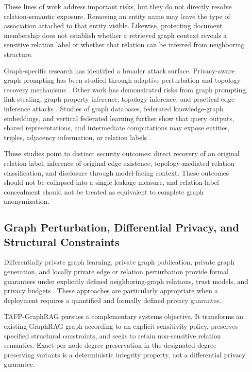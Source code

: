 \documentclass[preprint,12pt]{elsarticle}
\begin{document}
These lines of work address important risks, but they do not directly resolve relation-semantic exposure. Removing an entity name may leave the type of association attached to that entity visible. Likewise, protecting document membership does not establish whether a retrieved graph context reveals a sensitive relation label or whether that relation can be inferred from neighboring structure.

Graph-specific research has identified a broader attack surface. Privacy-aware graph prompting has been studied through adaptive perturbation and topology-recovery mechanisms \cite{ref16_jia_2026}. Other work has demonstrated risks from graph prompting, link stealing, graph-property inference, topology inference, and practical edge-inference attacks \cite{ref07_fu_2025,ref10_he_2021,ref20_li_2023,ref41_yuan_2024,ref45_zhang_2022,ref43_zhang_2023,ref46_zhu_2026}. Studies of graph databases, federated knowledge-graph embeddings, and vertical federated learning further show that query outputs, shared representations, and intermediate computations may expose entities, triples, adjacency information, or relation labels \cite{ref13_hu_2024,ref15_hu_2025b,ref32_qiu_2023}.

These studies point to distinct security outcomes: direct recovery of an original relation label, inference of original edge existence, topology-mediated relation classification, and disclosure through model-facing context. These outcomes should not be collapsed into a single leakage measure, and relation-label concealment should not be treated as equivalent to complete graph anonymization.

\subsection{Graph Perturbation, Differential Privacy, and Structural Constraints}
Differentially private graph learning, private graph publication, private graph generation, and locally private edge or relation perturbation provide formal guarantees under explicitly defined neighboring-graph relations, trust models, and privacy budgets \cite{ref04_chien_2023,ref11_hidano_2024,ref17_jian_2023,ref25_mendonca_2025,ref27_mueller_2023,ref38_yang_2021}. These approaches are particularly appropriate when a deployment requires a quantified and formally defined privacy guarantee.

TAFP-GraphRAG pursues a complementary systems objective. It transforms an existing GraphRAG graph according to an explicit sensitivity policy, preserves specified structural constraints, and seeks to retain non-sensitive relation semantics. Exact per-node degree preservation in the designated degree-preserving variants is a deterministic integrity property, not a differential privacy guarantee.
\end{document}
